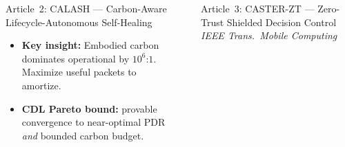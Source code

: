 \documentclass[final]{beamer}
\newlength{\sepwidth}
\newlength{\colwidth}
\newcommand{\separatorcolumn}{\begin{column}{\sepwidth}\end{column}}
\begin{document}
\begin{frame}[t]
\begin{columns}[t]
\begin{column}{\colwidth}
\begin{block}{Article~2: CALASH --- Carbon-Aware Lifecycle-Autonomous Self-Healing}
    \begin{itemize}
      \item \textbf{Key insight:} Embodied carbon dominates operational by $10^6$:$1$. Maximize useful packets to amortize.
      \item \textbf{CDL Pareto bound:} provable convergence to near-optimal PDR \textit{and} bounded carbon budget.
    \end{itemize}
  \end{block}

\end{column}

\separatorcolumn

\begin{column}{\colwidth}

  \begin{block}{Article~3: CASTER-ZT --- Zero-Trust Shielded Decision Control}
    {\small\textit{IEEE Trans.\ Mobile Computing}}


\end{block}
\end{column}
\end{columns}
\end{frame}
\end{document}
